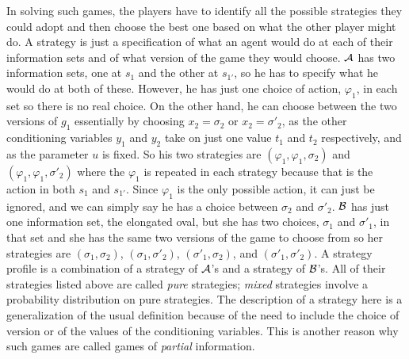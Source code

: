 In solving such games, the players have to identify all the possible strategies they could adopt and then choose the best one based on what the other player might do. A strategy is just a specification of what an agent would do at each of their information sets and of what version of the game they would choose. $\cal A$ has two information sets, one at $s_1$ and the other at $s_{1'}$, so he has to specify what he would do at both of these. However, he has just one choice of action, $\varphi_1$, in each set so there is no real choice. On the other hand, he can choose between the two versions of $g_1$ essentially by choosing $x_2 = \sigma_2$ or $x_2 = \sigma'_2$, as the other conditioning variables $y_1$ and $y_2$ take on just one value $t_1$ and $t_2$ respectively, and as the parameter $u$ is fixed. So his two strategies are $(\varphi_1, \varphi_1, \sigma_2)$ and $(\varphi_1, \varphi_1, \sigma'_2)$ where the $\varphi_1$ is repeated in each strategy because that is the action in both $s_1$ and $s_{1'}$. Since $\varphi_1$ is the only possible action, it can just be ignored, and we can simply say he has a choice between $\sigma_2$ and $\sigma'_2$. $\cal B$ has just one information set, the elongated oval, but she has two choices, $\sigma_1$ and $\sigma'_1$, in that set and she has the same two versions of the game to choose from so her strategies are $(\sigma_1, \sigma_2)$, $(\sigma_1, \sigma'_2)$, $(\sigma'_1, \sigma_2)$, and $(\sigma'_1, \sigma'_2)$. A strategy profile is a combination of a strategy of $\cal A$'s and a strategy of $\cal B$'s. All of their strategies listed above are called \emph{pure} strategies; \emph{mixed} strategies involve a probability distribution on pure strategies. The description of a strategy here is a generalization of the usual definition because of the need to include the choice of version or of the values of the conditioning variables. This is another reason why such games are called games of \emph{partial} information.


